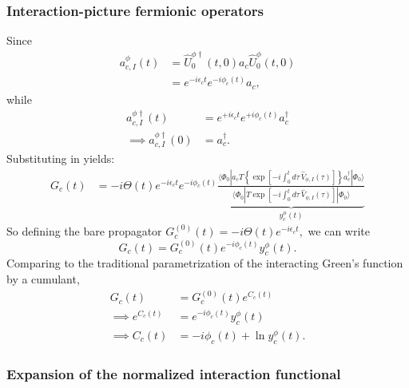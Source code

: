 \subsubsection{Interaction-picture fermionic operators}
Since
\begin{align}
    a_{c,I}^\phi(t)
    &=
    \hat U_0^{\phi\dagger}(t,0)
    a_c
    \hat U_0^\phi(t,0)
    \nonumber\\
    &=
    e^{-i\epsilon_c  t}
    e^{-i\phi_c(t)}
    a_c,
    \label{eq:a_phi_interaction}
\end{align}
while
\begin{align}
    a_{c,I}^{\phi\dagger}(t)
    &=
    e^{+i\epsilon_c  t}
    e^{+i\phi_c(t)}
    a_c^\dagger\\
\implies
    a_{c,I}^{\phi\dagger}(0)
    &=
    a_c^\dagger.
    \label{eq:adag_phi_interaction}
\end{align}
Substituting in yields:
\begin{align}
    G_c(t)
    &=
    -i\Theta(t)
    e^{-i\epsilon_c  t}
    e^{-i\phi_c(t)}
    \underbrace{\frac{\langle\Phi_0| a_c
    T\left\{
    \exp\left[
    -i\int_0^t d\tau\,
    \hat V_{\phi,I}(\tau)
    \right]
    \right\}a_c^\dagger|\Phi_0\rangle
    }{
    \langle\Phi_0|
    T
    \exp\left[
    -i\int_0^t d\tau\,
    \hat V_{\phi,I}(\tau)
    \right]
    |\Phi_0\rangle
    }}_{y_c^\phi(t)}
    \label{eq:G_phi_factored}
\end{align}
So defining the bare propagator $
    G_c^{(0)}(t)
    =
    -i\Theta(t)e^{-i\epsilon_c  t},
$
we can write
\begin{equation}
    {
    G_c(t)
    =
    G_c^{(0)}(t)
    e^{-i\phi_c(t)}
    y_c^\phi(t).
    }
\end{equation}
Comparing to the traditional parametrization of the interacting Green's function by a cumulant,
\begin{align}
    G_c(t)
    &=
    G_c^{(0)}(t)e^{C_c(t)}\\
\implies    e^{C_c(t)}
    &=
    e^{-i\phi_c(t)}
    y_c^\phi(t)\\
\implies    C_c(t)
    &=
    -i\phi_c(t)
    +
    \ln y_c^\phi(t).
    \label{eq:C_phi_y}
\end{align}
\subsubsection{Expansion of the normalized interaction functional}

